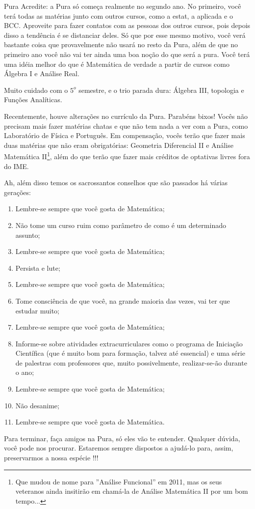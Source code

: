 \begin{subsecao}{Pura}
Acredite: a Pura só começa realmente no segundo ano. No primeiro, você terá
todas as matérias junto com outros cursos, como a estat, a aplicada e o BCC.
Aproveite para fazer contatos com as pessoas dos outros cursos, pois depois
disso a tendência é se distanciar deles. Só que por esse mesmo motivo, você
verá bastante coisa que provavelmente não usará no resto da Pura, além de que
no primeiro ano você não vai ter ainda uma boa noção do que será a pura. Você
terá uma idéia melhor do que é Matemática de verdade a partir de cursos
como Álgebra I e Análise Real.

Muito cuidado com o $5^{o}$ semestre, e o trio parada dura: Álgebra III,
topologia e Funções Analíticas.

Recentemente, houve alterações no currículo da Pura. Parabéns bixos! Vocês não
precisam mais fazer matérias chatas e que não tem nada a ver com a Pura, como
Laboratório de Física e Português. Em compensação, vocês terão que fazer mais
duas matérias que não eram obrigatórias: Geometria Diferencial II e Análise
Matemática II\footnote{Que mudou de nome para ''Análise Funcional'' em 2011,
mas os seus veteranos ainda insitirão em chamá-la de Análise Matemática II por
um bom tempo...}, além do que terão que fazer mais créditos de optativas livres
fora do IME.

Ah, além disso temos os sacrossantos conselhos que são passados há várias
gerações:
\begin{enumerate}
\item	Lembre-se sempre que você gosta de Matemática;
\item	Não tome um curso ruim como parâmetro de como é um determinado assunto;
\item	Lembre-se sempre que você gosta de Matemática;
\item	Persista e lute;
\item	Lembre-se sempre que você gosta de Matemática;
\item	Tome consciência de que você, na grande maioria das vezes, vai ter que
estudar muito;
\item	Lembre-se sempre que você gosta de Matemática;
\item	Informe-se sobre atividades extracurriculares como o programa de
Iniciação Científica (que é muito bom para formação, talvez até essencial) e
uma série de palestras com professores que, muito possivelmente, realizar-se-ão
durante o ano;
\item	Lembre-se sempre que você gosta de Matemática;
\item	Não desanime;
\item	Lembre-se sempre que você gosta de Matemática.

\end{enumerate}
Para terminar, faça amigos na Pura, só eles vão te entender. Qualquer dúvida,
você pode nos procurar. Estaremos sempre dispostos a ajudá-lo para, assim,
preservarmos a nossa espécie !!!

\end{subsecao}
